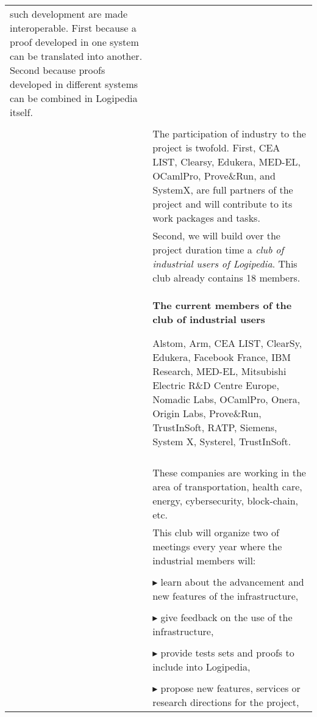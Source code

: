 \begin{longtable}{|p{}|p{}|}
  such development are made interoperable. First because a proof
  developed in one system can be translated into another. Second
  because proofs developed in different systems can be combined in
  Logipedia itself.\\
&\\
&
\hspace{0.4cm}
The participation of industry to the project is twofold.  First, CEA
LIST, Clearsy, Edukera, MED-EL, OCamlPro, Prove\&Run, and SystemX, are
full partners of the project and will contribute to its work packages
and tasks.
\\
&
\hspace{0.4cm}
Second, we will build over the project duration time a {\em club of
  industrial users of Logipedia}. This club already contains
18 members.
\\
&
\hspace{0.4cm}
\begin{framed}
\begin{center}
  {\bf \Large The current members of the club of industrial users}
\end{center}
Alstom, 
Arm,
CEA LIST, 
ClearSy, 
Edukera, 
Facebook France, 
IBM Research, 
MED-EL, 
Mitsubishi Electric R\&D Centre Europe,
Nomadic Labs,
OCamlPro, 
Onera, 
Origin Labs, 
Prove\&Run, 
TrustInSoft, 
RATP, 
Siemens, 
System X, 
Systerel, 
TrustInSoft.
\end{framed}\\
&\\
&
\hspace{0.4cm}
These companies are working in the area of transportation, health
care, energy, cybersecurity, block-chain, etc.
\\
&
\hspace{0.4cm}
This club will organize two of meetings every year where the
industrial members will:\\
&\\
&
$\blacktriangleright$ 
learn about the advancement and new features of the infrastructure,\\
&\\
&
$\blacktriangleright$ 
give feedback on the use of the infrastructure,
\\
&\\
&
$\blacktriangleright$ provide tests sets and proofs to include into Logipedia,
\\
&\\
&
$\blacktriangleright$ propose new features, services or research directions for the project,
\\

\end{longtable}

